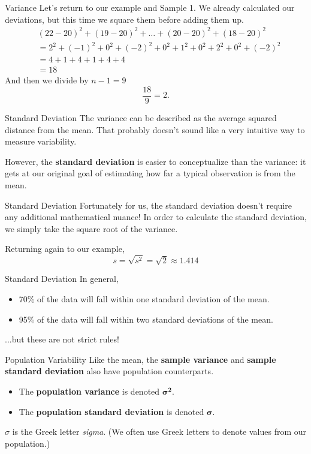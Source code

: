 \begin{frame}{Variance}
    Let's return to our example and Sample 1. We already calculated our deviations, but this time we square them before adding them up.
    \begin{align*}
        & (22-20)^2 + (19-20)^2 + \dots + (20-20)^2 + (18-20)^2 \\
        & = 2^2 + (-1)^2 + 0^2 + (-2)^2 + 0^2 + 1^2 + 0^2 + 2^2 + 0^2 + (-2)^2 \\
        &= 4 + 1 + 4 + 1 + 4 + 4 \\
        &= 18
    \end{align*}
    And then we divide by $n-1=9$
    \[
    \frac{18}{9}=2.
    \]
\end{frame}

\begin{frame}{Standard Deviation}
    The variance can be described as the average squared distance from the mean. That probably doesn't sound like a very intuitive way to measure variability.
    
    \vspace{12pt}However, the \textbf{standard deviation} is easier to conceptualize than the variance: it gets at our original goal of estimating how far a typical observation is from the mean.
\end{frame}

\begin{frame}{Standard Deviation}
    Fortunately for us, the standard deviation doesn't require any additional mathematical nuance! In order to calculate the standard deviation, we simply take the square root of the variance.
    
    \vspace{12pt}Returning again to our example, 
    \[
    s = \sqrt{s^2} = \sqrt{2} \approx 1.414
    \]
\end{frame}

\begin{frame}{Standard Deviation}
    In general,
    \begin{itemize}
        \item 70\% of the data will fall within one standard deviation of the mean.
        \item 95\% of the data will fall within two standard deviations of the mean.
    \end{itemize}
    ...but these are not strict rules!
\end{frame}

\begin{frame}{Population Variability}
    Like the mean, the \textbf{sample variance} and \textbf{sample standard deviation} also have population counterparts.
    \begin{itemize}
        \item The \textbf{population variance} is denoted $\boldsymbol{\sigma^2}$.
        \item The \textbf{population standard deviation} is denoted $\boldsymbol{\sigma}$.
    \end{itemize}
    $\sigma$ is the Greek letter \textit{sigma}. (We often use Greek letters to denote values from our population.)
\end{frame}

